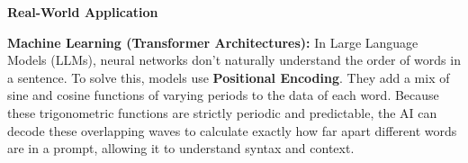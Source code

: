 \documentclass[12pt]{article}
\theoremstyle{definition}
\newenvironment{remark}[1][]{%
  \begin{remarkbox}[title={\bfseries Remark~\thetcbcounter\ifx\relax#1\relax\else\ (#1)\fi}]%
}{%
  \end{remarkbox}%
}
\begin{document}
\textbf{Real-World Application}

\begin{remark}
\textbf{Machine Learning (Transformer Architectures):}
In Large Language Models (LLMs), neural networks don't naturally understand the order of words in a sentence. To solve this, models use \textbf{Positional Encoding}. They add a mix of sine and cosine functions of varying periods to the data of each word. Because these trigonometric functions are strictly periodic and predictable, the AI can decode these overlapping waves to calculate exactly how far apart different words are in a prompt, allowing it to understand syntax and context.
\end{remark}
\end{document}
